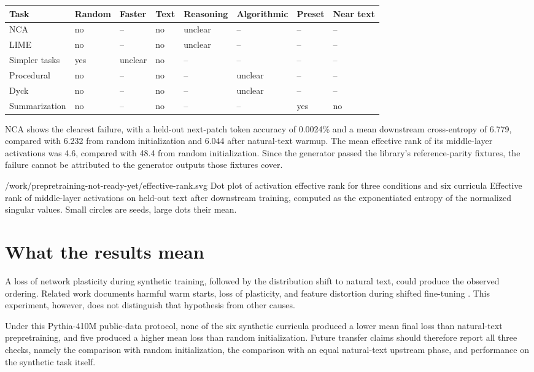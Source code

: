 \documentclass[11pt]{article}
\begin{document}
\begin{tabular}{@{}llllllll@{}}
\toprule
Task & Random & Faster & Text & Reasoning & Algorithmic & Preset & Near text \\
\midrule
NCA & no & -- & no & unclear & -- & -- & -- \\
LIME & no & -- & no & unclear & -- & -- & -- \\
Simpler tasks & yes & unclear & no & -- & -- & -- & -- \\
Procedural & no & -- & no & -- & unclear & -- & -- \\
Dyck & no & -- & no & -- & unclear & -- & -- \\
Summarization & no & -- & no & -- & -- & yes & no \\
\bottomrule
\end{tabular}

NCA shows the clearest failure, with a held-out next-patch token accuracy of 0.0024\% and a mean downstream cross-entropy of 6.779, compared with 6.232 from random initialization and 6.044 after natural-text warmup. The mean effective rank of its middle-layer activations was 4.6, compared with 48.4 from random initialization. Since the generator passed the library's reference-parity fixtures, the failure cannot be attributed to the generator outputs those fixtures cover.

  {/work/prepretraining-not-ready-yet/effective-rank.svg}
  {Dot plot of activation effective rank for three conditions and six curricula}
  {Effective rank of middle-layer activations on held-out text after downstream training, computed as the exponentiated entropy of the normalized singular values. Small circles are seeds, large dots their mean.}

\section{What the results mean}\label{meaning}

A loss of network plasticity during synthetic training, followed by the distribution shift to natural text, could produce the observed ordering. Related work documents harmful warm starts, loss of plasticity, and feature distortion during shifted fine-tuning \cite{ash2020,dohare2023,kumar2022}. This experiment, however, does not distinguish that hypothesis from other causes.

Under this Pythia-410M public-data protocol, none of the six synthetic curricula produced a lower mean final loss than natural-text prepretraining, and five produced a higher mean loss than random initialization. Future transfer claims should therefore report all three checks, namely the comparison with random initialization, the comparison with an equal natural-text upstream phase, and performance on the synthetic task itself.
\end{document}

